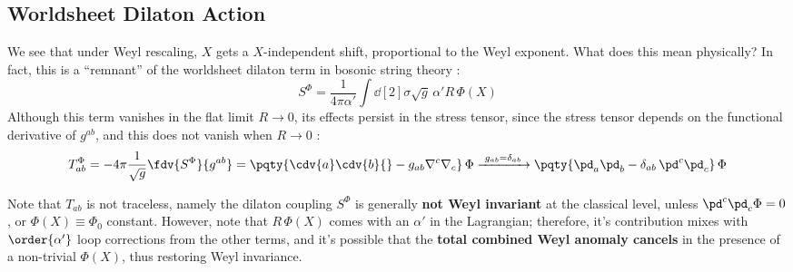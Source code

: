 \documentclass[a4paper
	,10pt
]{article}
\begin{document}
\subsection{Worldsheet Dilaton Action}
	We see that under Weyl rescaling, $X$ gets a $X$-independent shift, proportional to the Weyl exponent. What does this mean physically? In fact, this is a ``remnant'' of the worldsheet dilaton term in bosonic string theory \cite{Polchinski:1998rq}:
	\begin{equation}
		S^\Phi = \frac{1}{4\pi\alpha'}
			\int \dd[2]{\sigma} \sqrt{g}\,
				\alpha' R\,\Phi(X)
	\end{equation}
	Although this term vanishes in the flat limit $R \to 0$, its effects persist in the stress tensor, since the stress tensor depends on the functional derivative of $g^{ab}$, and this does not vanish when $R \to 0$ \cite{Tong:2009np}:
	\begin{equation}
		T^\Phi_{ab}
		= -4\pi \frac{1}{\sqrt{g}} \fdv{S^\Phi}{g^{ab}}
		= \pqty{
				\cdv{a} \cdv{b} {}
				- g_{ab} \nabla^c \nabla_c
			}\,\Phi
		\xrightarrow{\ g_{ab} = \delta_{ab}\ }
		\pqty{
				\pd_a \pd_b
				- \delta_{ab}\, \pd^c \pd_c
			}\,\Phi
	\end{equation}
	
	Note that $T_{ab}$ is not traceless, namely the dilaton coupling $S^\Phi$ is generally \textbf{not Weyl invariant} at the classical level, unless $\pd^c \pd_c \Phi = 0$, or $\Phi(X) \equiv \Phi_0$ constant. 
	However, note that $R\,\Phi(X)$ comes with an $\alpha'$ in the Lagrangian; therefore, it's contribution mixes with $\order{\alpha'}$ loop corrections from the other terms, and it's possible that the \textbf{total combined Weyl anomaly cancels} in the presence of a non-trivial $\Phi(X)$, thus restoring Weyl invariance. 
	
\end{document}

